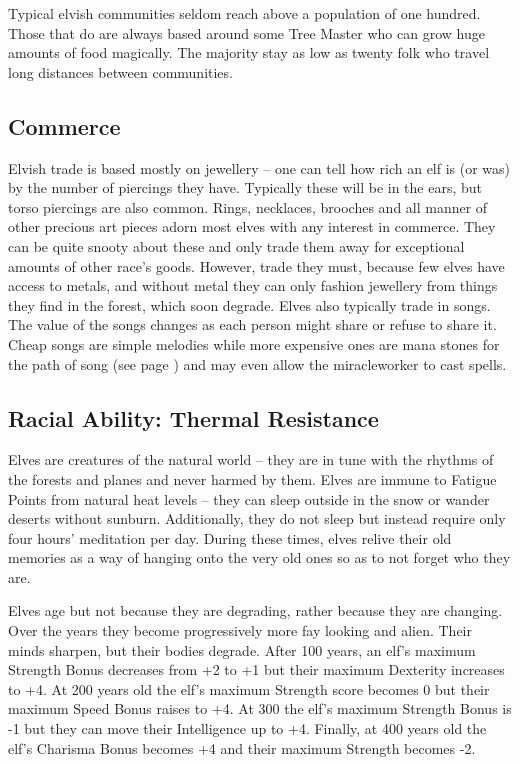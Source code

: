 \begin{multicols}{2}
Typical elvish communities seldom reach above a population of one hundred. Those that do are always based around some Tree Master who can grow huge amounts of food magically. The majority stay as low as twenty folk who travel long distances between communities.

\subsection{Commerce}

Elvish trade is based mostly on jewellery -- one can tell how rich an elf is (or was) by the number of piercings they have. Typically these will be in the ears, but torso piercings are also common. Rings, necklaces, brooches and all manner of other precious art pieces adorn most elves with any interest in commerce. They can be quite snooty about these and only trade them away for exceptional amounts of other race's goods. However, trade they must, because few elves have access to metals, and without metal they can only fashion jewellery from things they find in the forest, which soon degrade. Elves also typically trade in songs. The value of the songs changes as each person might share or refuse to share it. Cheap songs are simple melodies while more expensive ones are mana stones for the path of song (see page \pageref{song}) and may even allow the \gls{miracleworker} to cast spells.

\subsection{Racial Ability: Thermal Resistance}

Elves are creatures of the natural world -- they are in tune with the rhythms of the forests and planes and never harmed by them. Elves are immune to Fatigue Points from natural heat levels -- they can sleep outside in the snow or wander deserts without sunburn. Additionally, they do not sleep but instead require only four hours' meditation per day. During these times, elves relive their old memories as a way of hanging onto the very old ones so as to not forget who they are.

Elves age but not because they are degrading, rather because they are changing.
Over the years they become progressively more fay looking and alien.
Their minds sharpen, but their bodies degrade.
After 100 years, an elf's maximum Strength Bonus decreases from +2 to +1 but their maximum Dexterity increases to +4.
At 200 years old the elf's maximum Strength score becomes 0 but their maximum Speed Bonus raises to +4.
At 300 the elf's maximum Strength Bonus is -1 but they can move their Intelligence up to +4.
Finally, at 400 years old the elf's Charisma Bonus becomes +4 and their maximum Strength becomes -2.


\end{multicols}
